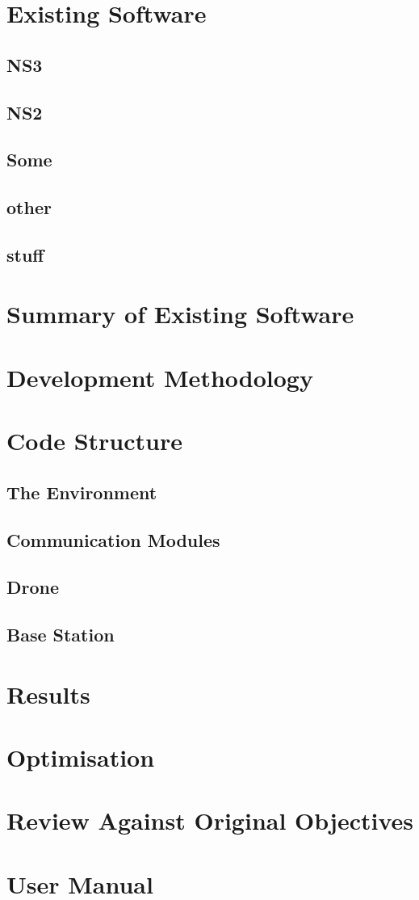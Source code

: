 \section{Existing Software}
	\subsection{NS3}
	\subsection{NS2}
	\subsection{Some}
	\subsection{other}
	\subsection{stuff}
\section{Summary of Existing Software}
\section{Development Methodology}
\section{Code Structure}
	\subsection{The Environment}
	\subsection{Communication Modules}
	\subsection{Drone}
	\subsection{Base Station}
\section{Results}
\section{Optimisation}
\section{Review Against Original Objectives}
\section{User Manual}
